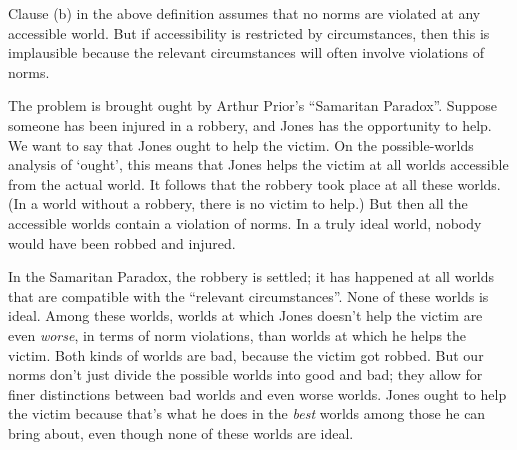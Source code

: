 


Clause (b) in the above definition assumes that no norms are violated at any
accessible world. But if accessibility is restricted by circumstances, then this
is implausible because the relevant circumstances will often involve violations of
norms.

The problem is brought ought by Arthur Prior's ``Samaritan Paradox''.  Suppose
someone has been injured in a robbery, and Jones has the opportunity to help. We
want to say that Jones ought to help the victim. On the possible-worlds analysis
of `ought', this means that Jones helps the victim at all worlds accessible from
the actual world. It follows that the robbery took place at all these
worlds. (In a world without a robbery, there is no victim to help.)  But then
all the accessible worlds contain a violation of norms. In a truly ideal world,
nobody would have been robbed and injured.

In the Samaritan Paradox, the robbery is settled; it has happened at all worlds
that are compatible with the ``relevant circumstances''. None of these worlds is
ideal. Among these worlds, worlds at which Jones doesn't help the victim are
even \emph{worse}, in terms of norm violations, than worlds at which he helps
the victim. Both kinds of worlds are bad, because the victim got robbed. But our
norms don't just divide the possible worlds into good and bad; they allow for
finer distinctions between bad worlds and even worse worlds. Jones ought to help
the victim because that's what he does in the \emph{best} worlds among those he
can bring about, even though none of these worlds are ideal.

